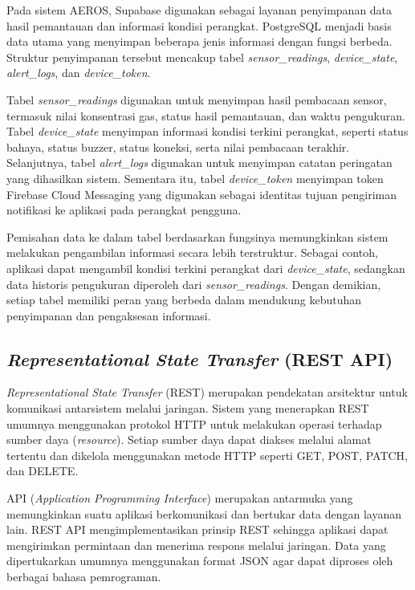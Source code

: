 Pada sistem AEROS, Supabase digunakan sebagai layanan penyimpanan data hasil pemantauan dan informasi kondisi perangkat. PostgreSQL menjadi basis data utama yang menyimpan beberapa jenis informasi dengan fungsi berbeda. Struktur penyimpanan tersebut mencakup tabel \textit{sensor\_readings}, \textit{device\_state}, \textit{alert\_logs}, dan \textit{device\_token}.

Tabel \textit{sensor\_readings} digunakan untuk menyimpan hasil pembacaan sensor, termasuk nilai konsentrasi gas, status hasil pemantauan, dan waktu pengukuran. Tabel \textit{device\_state} menyimpan informasi kondisi terkini perangkat, seperti status bahaya, status buzzer, status koneksi, serta nilai pembacaan terakhir. Selanjutnya, tabel \textit{alert\_logs} digunakan untuk menyimpan catatan peringatan yang dihasilkan sistem. Sementara itu, tabel \textit{device\_token} menyimpan token Firebase Cloud Messaging yang digunakan sebagai identitas tujuan pengiriman notifikasi ke aplikasi pada perangkat pengguna.

Pemisahan data ke dalam tabel berdasarkan fungsinya memungkinkan sistem melakukan pengambilan informasi secara lebih terstruktur. Sebagai contoh, aplikasi dapat mengambil kondisi terkini perangkat dari \textit{device\_state}, sedangkan data historis pengukuran diperoleh dari \textit{sensor\_readings}. Dengan demikian, setiap tabel memiliki peran yang berbeda dalam mendukung kebutuhan penyimpanan dan pengaksesan informasi.

\subsection{\textit{Representational State Transfer} (REST API)}
\label{subsec:REST_API}

\textit{Representational State Transfer} (REST) merupakan pendekatan arsitektur untuk komunikasi antarsistem melalui jaringan. Sistem yang menerapkan REST umumnya menggunakan protokol HTTP untuk melakukan operasi terhadap sumber daya (\textit{resource}). Setiap sumber daya dapat diakses melalui alamat tertentu dan dikelola menggunakan metode HTTP seperti GET, POST, PATCH, dan DELETE.

API (\textit{Application Programming Interface}) merupakan antarmuka yang memungkinkan suatu aplikasi berkomunikasi dan bertukar data dengan layanan lain. REST API mengimplementasikan prinsip REST sehingga aplikasi dapat mengirimkan permintaan dan menerima respons melalui jaringan. Data yang dipertukarkan umumnya menggunakan format JSON agar dapat diproses oleh berbagai bahasa pemrograman.

